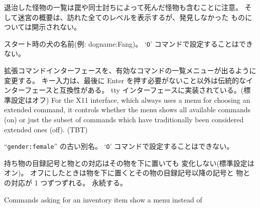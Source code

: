 退治した怪物の一覧は罠や同士討ちによって死んだ怪物も含むことに注意。
そして迷宮の概要は、訪れた全てのレベルを表示するが、発見しなかった
ものについては開示されない。
\item[\ib{dogname}]
スタート時の犬の名前(例: dogname:Fang)。
`{\tt O}' コマンドで設定することはできない。
\item[\ib{extmenu}]
拡張コマンドインターフェースを、有効なコマンドの一覧メニューが出るように変更する。
キー入力は、最後に Enter を押す必要がないこと以外は伝統的なインターフェースと互換性がある。
tty インターフェースに実装されている。(標準設定はオフ)
For the X11 interface, which always uses a menu for choosing an extended
command, it controls whether the menu shows all available commands (on)
or just the subset of commands which have traditionally been considered
extended ones (off).
(TBT)
\item[\ib{female}]
``{\tt gender:female}'' の古い別名。
`{\tt O}' コマンドで設定することはできない。
\item[\ib{fixinv}]
持ち物の目録記号と物との対応はその物を下に置いても
変化しない(標準設定はオン)。
オフにしたときは物を下に置くとその物の目録記号以降の記号と
物との対応が 1 つずつずれる。
永続する。
\item[\ib{force\_invmenu}]
Commands asking for an inventory item show a menu instead of
